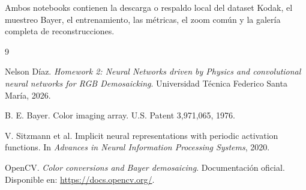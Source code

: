 \documentclass[11pt,a4paper]{article}
\begin{document}
Ambos notebooks contienen la descarga o respaldo local del dataset Kodak, el muestreo Bayer, el entrenamiento, las métricas, el zoom común y la galería completa de reconstrucciones.

\begin{thebibliography}{9}

Nelson Díaz. \textit{Homework 2: Neural Networks driven by Physics and convolutional neural networks for RGB Demosaicking}. Universidad Técnica Federico Santa María, 2026.

B. E. Bayer. Color imaging array. U.S. Patent 3,971,065, 1976.

V. Sitzmann et al. Implicit neural representations with periodic activation functions. In \textit{Advances in Neural Information Processing Systems}, 2020.

OpenCV. \textit{Color conversions and Bayer demosaicing}. Documentación oficial. Disponible en: \url{https://docs.opencv.org/}.

\end{thebibliography}
\end{document}
